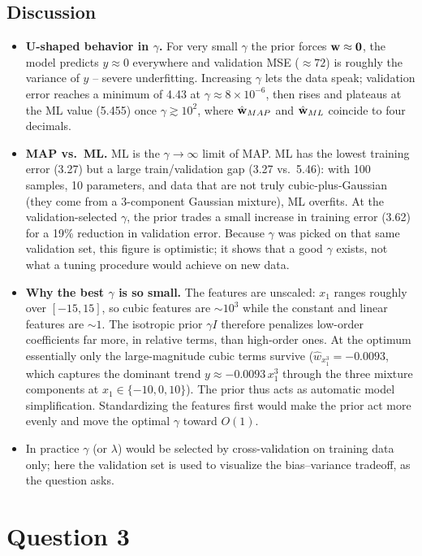 \documentclass[11pt]{article}
\begin{document}
\subsection*{Discussion}
\begin{itemize}
\item \textbf{U-shaped behavior in $\gamma$.} For very small $\gamma$ the prior forces $\mathbf{w}\approx\mathbf 0$, the model predicts $y\approx0$ everywhere and validation MSE ($\approx72$) is roughly the variance of $y$ -- severe underfitting. Increasing $\gamma$ lets the data speak; validation error reaches a minimum of 4.43 at $\gamma\approx8\times10^{-6}$, then rises and plateaus at the ML value (5.455) once $\gamma\gtrsim10^2$, where $\hat{\mathbf{w}}_{MAP}$ and $\hat{\mathbf{w}}_{ML}$ coincide to four decimals.
\item \textbf{MAP vs.\ ML.} ML is the $\gamma\to\infty$ limit of MAP. ML has the lowest training error (3.27) but a large train/validation gap (3.27 vs.\ 5.46): with 100 samples, 10 parameters, and data that are not truly cubic-plus-Gaussian (they come from a 3-component Gaussian mixture), ML overfits. At the validation-selected $\gamma$, the prior trades a small increase in training error (3.62) for a 19\% reduction in validation error. Because $\gamma$ was picked on that same validation set, this figure is optimistic; it shows that a good $\gamma$ exists, not what a tuning procedure would achieve on new data.
\item \textbf{Why the best $\gamma$ is so small.} The features are unscaled: $x_1$ ranges roughly over $[-15,15]$, so cubic features are $\sim10^3$ while the constant and linear features are $\sim1$. The isotropic prior $\gamma I$ therefore penalizes low-order coefficients far more, in relative terms, than high-order ones. At the optimum essentially only the large-magnitude cubic terms survive ($\hat w_{x_1^3}=-0.0093$, which captures the dominant trend $y\approx -0.0093\,x_1^3$ through the three mixture components at $x_1\in\{-10,0,10\}$). The prior thus acts as automatic model simplification. Standardizing the features first would make the prior act more evenly and move the optimal $\gamma$ toward $O(1)$.
\item In practice $\gamma$ (or $\lambda$) would be selected by cross-validation on training data only; here the validation set is used to visualize the bias--variance tradeoff, as the question asks.
\end{itemize}

\section*{Question 3}
\end{document}
